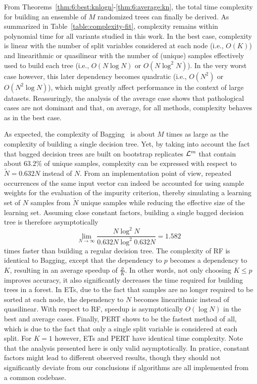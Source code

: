From Theorems~\ref{thm:6:best:knlogn}-\ref{thm:6:average:kn}, the total time
complexity for building an ensemble of $M$ randomized trees can finally be
derived. As summarized in Table~\ref{table:complexity-fit}, complexity remains
within polynomial time for all variants studied in this work. In the best
case, complexity is linear with the number of split variables considered at
each node (i.e., $O(K)$) and linearithmic or quasilinear with the number of
(unique) samples effectively used to build each tree (i.e., $O(N\log N)$ or
$O(N\log^2 N)$). In the very worst case however, this later dependency becomes quadratic
(i.e., $O(N^2)$ or $O(N^2 \log N)$), which might greatly affect performance in
the context of large datasets. Reassuringly, the analysis of the average case
shows that pathological cases are not dominant and that, on average, for all methods, complexity
behaves as in the best case.

As expected, the complexity of Bagging~\citep{breiman:1996b} is about $M$ times
as large as the complexity of building a single decision tree. Yet, by taking
into account the fact that bagged decision trees are built on bootstrap
replicates ${\cal L}^m$ that contain about $63.2\%$ of unique samples,
complexity can be expressed with respect to $\widetilde{N} = 0.632 N$ instead
of $N$. From an implementation point of view, repeated occurrences of the same
input vector can indeed be accounted for using sample weights for the
evaluation of the impurity criterion, thereby  simulating a learning set of $N$
samples from $\widetilde{N}$ unique samples while reducing the effective size
of the learning set. Assuming close constant factors, building a single bagged
decision tree is therefore asymptotically
\begin{equation}
\lim_{N\to \infty} \frac{N\log^2 N}{0.632N \log^2 0.632N} = 1.582
\end{equation}
times faster than building a regular decision tree. The complexity of RF is
identical to Bagging, except that the dependency
to $p$ becomes a dependency to $K$, resulting in an average speedup of
$\tfrac{p}{K}$. In other words, not only choosing $K \leq p$ improves accuracy,
it also significantly decreases the time required for building trees in a
forest. In ETs, due to the fact that
samples are no longer required to be sorted at each node, the dependency to $N$
becomes linearithmic instead of quasilinear. With respect to RF,
speedup is asymptotically $O(\log N)$ in the best and average cases.
Finally, PERT shows to be the fastest
method of all, which is due to the fact that only a single split variable
is considered at each split. For $K=1$ however, ETs and PERT have identical
time complexity. Note that the analysis presented here is only valid
asymptotically. In pratice, constant factors might lead to different
observed results, though they should not significantly deviate  from our conclusions if
algorithms are all implemented from a common codebase.

